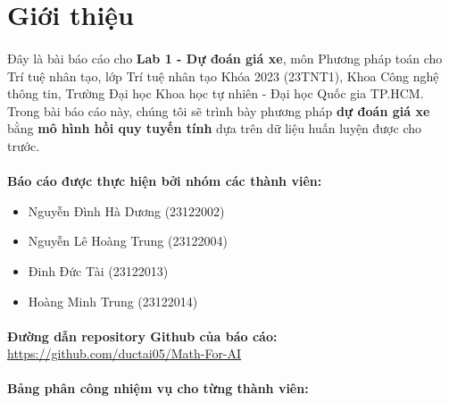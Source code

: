\newpage
\section{Giới thiệu}

\paragraph{}{Đây là bài báo cáo cho \textbf{Lab 1 - Dự đoán giá xe}, môn Phương pháp toán cho Trí tuệ nhân tạo, lớp Trí tuệ nhân tạo Khóa 2023 (23TNT1), Khoa Công nghệ thông tin, Trường Đại học Khoa học tự nhiên - Đại học Quốc gia TP.HCM. Trong bài báo cáo này, chúng tôi sẽ trình bày phương pháp \textbf{dự đoán giá xe} bằng \textbf{mô hình hồi quy tuyến tính} dựa trên dữ liệu huấn luyện được cho trước.}

\paragraph{}{\textbf{Báo cáo được thực hiện bởi nhóm các thành viên:}} 
\begin{itemize}
    \item Nguyễn Đình Hà Dương (23122002)
    \item Nguyễn Lê Hoàng Trung (23122004)
    \item Đinh Đức Tài (23122013)
    \item Hoàng Minh Trung (23122014)
\end{itemize}

\paragraph{}{\textbf{Đường dẫn repository Github của báo cáo:}} \href{https://github.com/ductai05/Math-For-AI}{https://github.com/ductai05/Math-For-AI} \cite{repo}

\paragraph{}{\textbf{Bảng phân công nhiệm vụ cho từng thành viên:}}

